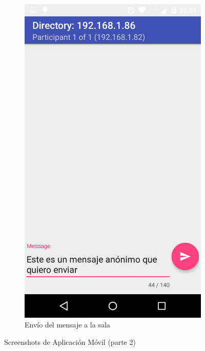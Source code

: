 \begin{figure}[H]
\begin{subfigure}[b]{0.4\textwidth}
        \includegraphics[width=\textwidth]{imagenes/mobile_message.png}
        \caption{Envío del mensaje a la sala}
        \label{fig:mobile_set_msg}
    \end{subfigure}
    \caption{Screenshots de Aplicación Móvil (parte 2)}
    \label{fig:mobile_screenshots_2}
\end{figure}
